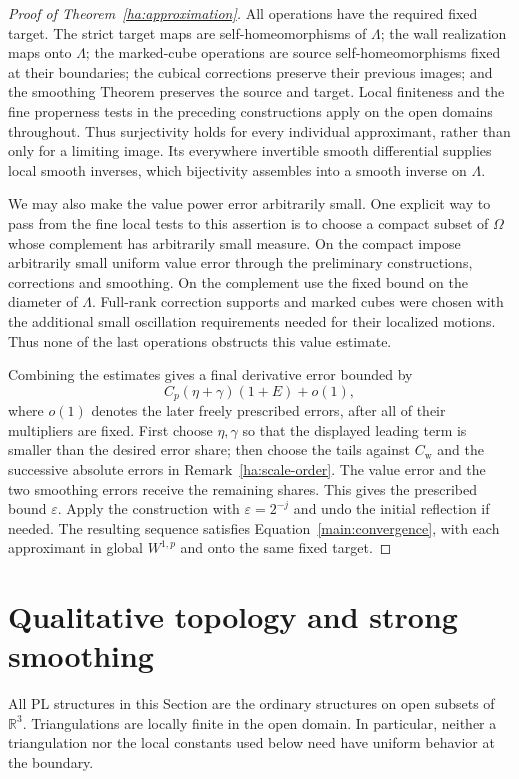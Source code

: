 \documentclass[11pt]{article}
\numberwithin{equation}{section}
\theoremstyle{definition}
\theoremstyle{remark}
\newcommand{\R}{\mathbb R}
\newcommand{\eps}{\varepsilon}
\begin{document}
\begin{proof}[Proof of Theorem~\ref{ha:approximation}]
All operations have the required fixed target.  The strict target
maps are self-homeomorphisms of $\Lambda$; the wall realization
maps onto $\Lambda$; the marked-cube operations are source
self-homeomorphisms fixed at their boundaries; the cubical
corrections preserve their previous images; and the smoothing
Theorem preserves the source and target.  Local finiteness and the
fine properness tests in the preceding constructions apply on the
open domains throughout.
Thus surjectivity holds for every individual approximant, rather
than only for a limiting image.  Its everywhere invertible smooth
differential supplies local smooth inverses, which bijectivity
assembles into a smooth inverse on $\Lambda$.

We may also make the value power error arbitrarily small.  One
explicit way to pass from the fine local tests to this assertion is
to choose a compact subset of $\Omega$ whose complement has
arbitrarily small measure.  On the compact impose arbitrarily small
uniform value error through the preliminary constructions,
corrections and smoothing.  On the complement use the fixed bound
on the diameter of $\Lambda$.  Full-rank correction supports and
marked cubes were chosen with the additional small oscillation
requirements needed for their localized motions.  Thus none of the
last operations obstructs this value estimate.

Combining the estimates gives a final derivative error bounded by
\[
                    C_p(\eta+\gamma)(1+E)+o(1),
\]
where $o(1)$ denotes the later freely prescribed errors, after all
of their multipliers are fixed.  First choose $\eta,\gamma$ so that
the displayed leading term is smaller than the desired error share;
then choose the tails against $C_{\mathrm w}$ and the successive
absolute errors in Remark~\ref{ha:scale-order}.  The value error
and the two smoothing errors receive the remaining shares.  This
gives the prescribed bound $\eps$.  Apply the construction with
$\eps=2^{-j}$ and undo the initial reflection if needed.
The resulting sequence satisfies Equation~\eqref{main:convergence},
with each approximant in global $W^{1,p}$ and onto the same fixed target.
\end{proof}

\appendix
\section{Qualitative topology and strong smoothing}
\label{sec:smoothing}

All PL structures in this Section are the ordinary structures on open
subsets of $\R^3$.  Triangulations are locally finite in the open domain.
In particular, neither a triangulation nor the local constants used below
need have uniform behavior at the boundary.
\end{document}
